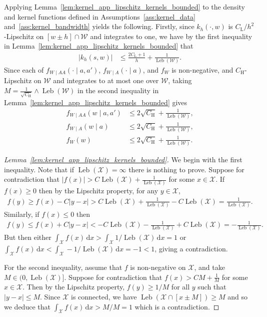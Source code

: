 \documentclass[11pt,lof]{puthesis}
\newcommand{\rH}{\ensuremath{\mathrm{H}}}
\newcommand{\rL}{\ensuremath{\mathrm{L}}}
\newcommand{\cX}{\ensuremath{\mathcal{X}}}
\newcommand{\cW}{\ensuremath{\mathcal{W}}}
\DeclareMathOperator{\Leb}{Leb}
\newcommand{\diff}[1]{\,\mathrm{d}#1}
\theoremstyle{break}
\theoremstyle{proof}
\newtheorem{proof}{Proof}
\begin{document}
Applying Lemma~\ref{lem:kernel_app_lipschitz_kernels_bounded}
to the density and kernel functions defined in
Assumptions~\ref{ass:kernel_data} and~\ref{ass:kernel_bandwidth}
yields the following.
Firstly, since $k_h(\cdot, w)$ is $C_\rL / h^2$-Lipschitz
on $[w \pm h] \cap \cW$ and integrates to one,
we have by the first inequality in
Lemma~\ref{lem:kernel_app_lipschitz_kernels_bounded} that
%
\begin{align*}
  |k_h(s,w)|
  &\leq \frac{2 C_\rL + 1}{h} + \frac{1}{\Leb(\cW)}.
\end{align*}
%
Since each of
$f_{W \mid AA}(\cdot \mid a,a')$,
$f_{W \mid A}(\cdot \mid a)$, and
$f_W$ is non-negative, and $C_\rH$-Lipschitz on $\cW$
and integrates to at most one over $\cW$,
taking $M = \frac{1}{\sqrt{C_\rH}} \wedge \Leb(\cW)$
in the second inequality in
Lemma~\ref{lem:kernel_app_lipschitz_kernels_bounded}
gives
%
\begin{align*}
  f_{W \mid AA}(w \mid a,a')
  &\leq 2 \sqrt{C_\rH} + \frac{1}{\Leb(\cW)}, \\
  f_{W \mid A}(w \mid a)
  &\leq 2 \sqrt{C_\rH} + \frac{1}{\Leb(\cW)}, \\
  f_W(w)
  &\leq 2 \sqrt{C_\rH} + \frac{1}{\Leb(\cW)}.
\end{align*}

\begin{proof}[Lemma~\ref{lem:kernel_app_lipschitz_kernels_bounded}]

  We begin with the first inequality.
  Note that if $\Leb(\cX) = \infty$ there is nothing to prove.
  Suppose for contradiction that
  $|f(x)| > C \Leb(\cX) + \frac{1}{\Leb(\cX)}$
  for some $x \in \cX$.
  If $f(x) \geq 0$
  then by the Lipschitz property, for any $y \in \cX$,
  \begin{align*}
    f(y)
    \geq f(x) - C|y-x|
    > C \Leb(\cX) + \frac{1}{\Leb(\cX)} - C\Leb(\cX)
    = \frac{1}{\Leb(\cX)}.
  \end{align*}
  Similarly, if $f(x) \leq 0$ then
  \begin{align*}
    f(y)
    \leq f(x) + C|y-x|
    < - C \Leb(\cX) - \frac{1}{\Leb(\cX)} + C\Leb(\cX)
    = -\frac{1}{\Leb(\cX)}.
  \end{align*}
  But then either
  $\int_\cX f(x) \diff{x} > \int_\cX 1/\Leb(\cX) \diff{x} = 1$
  or
  $\int_\cX f(x) \diff{x} < \int_\cX -1/\Leb(\cX) \diff{x} = -1 < 1$,
  giving a contradiction.

  For the second inequality,
  assume that $f$ is non-negative on $\cX$,
  and take $M \in \big(0, \Leb(\cX)\big]$.
  Suppose for contradiction that
  $f(x) > C M + \frac{1}{M}$
  for some $x \in \cX$.
  Then by the Lipschitz property, $f(y) \geq 1/M$
  for all $y$ such that $|y - x| \leq M$.
  Since $\cX$ is connected, we have
  $\Leb(\cX \cap [x \pm M]) \geq M$
  and so we deduce that
  $\int_\cX f(x) \diff{x} > M/M = 1$
  which is a contradiction.
\end{proof}
\end{document}
